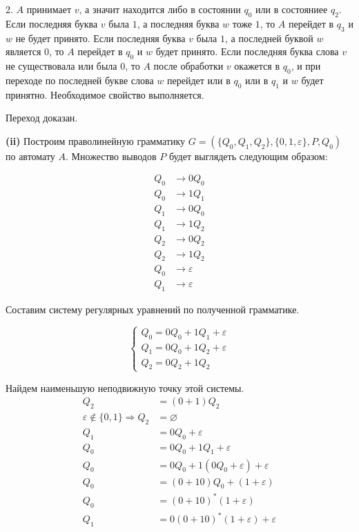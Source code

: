\documentclass[10pt]{article}
\let \eps \varepsilon
\begin{document}
2. $A$ принимает $v$, а значит находится либо в состоянии $q_0$ или в состояниее $q_2$. Если последняя буква $v$ была $1$, а последняя буква $w$ тоже $1$, то $A$ перейдет в $q_3$ и $w$ не будет принято. Если последняя буква $v$ была $1$, а последней буквой $w$ является $0$, то $A$ перейдет в $q_0$ и $w$ будет принято. Если последняя буква слова $v$ не существовала или была $0$, то $A$ после обработки $v$ окажется в $q_0$, и при переходе по последней букве слова $w$ перейдет или в $q_0$ или в $q_1$ и $w$ будет принятно. Необходимое свойство выполняется.

Переход доказан.

\smallskip

{\bf (ii)}
Построим праволинейную грамматику $G = (\{ Q_0, Q_1, Q_2 \}, \{ 0, 1, \eps \}, P, Q_0)$ по автомату $A$. Множество выводов $P$ будет выглядеть следующим образом:

\begin{align*}
  Q_0 &\rightarrow 0 Q_0 \\
  Q_0 &\rightarrow 1 Q_1 \\
  Q_1 &\rightarrow 0 Q_0 \\
  Q_1 &\rightarrow 1 Q_2 \\
  Q_2 &\rightarrow 0 Q_2 \\
  Q_2 &\rightarrow 1 Q_2 \\
  Q_0 &\rightarrow \eps \\
  Q_1 &\rightarrow \eps
\end{align*}

Составим систему регулярных уравнений по полученной грамматике.

$$
\begin{cases}
  Q_0 = 0 Q_0 + 1 Q_1 + \eps \\
  Q_1 = 0 Q_0 + 1 Q_2 + \eps \\
  Q_2 = 0 Q_2 + 1 Q_2
\end{cases}
$$

Найдем наименьшую неподвижную точку этой системы.
\begin{align*}
  Q_2 &= (0 + 1) Q_2 \\
  \eps \notin \{ 0, 1 \} \Rightarrow Q_2 &= \varnothing \\
  Q_1 &= 0 Q_0 + \eps \\
  Q_0 &= 0 Q_0 + 1 Q_1 + \eps \\
  Q_0 &= 0 Q_0 + 1 (0 Q_0 + \eps) + \eps \\
  Q_0 &= (0 + 10) Q_0 + (1 + \eps) \\
  Q_0 &= (0 + 10)^* (1 + \eps) \\
  Q_1 &= 0 (0 + 10)^* (1 + \eps) + \eps
\end{align*}
\end{document}
